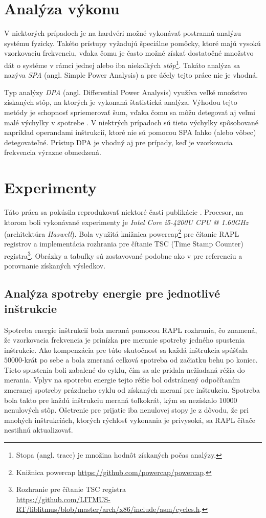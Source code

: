\section{Analýza výkonu}
V niektorých prípadoch je na hardvéri možné vykonávať postrannú analýzu systému fyzicky. Takéto prístupy vyžadujú špeciálne pomôcky,
ktoré majú vysokú vzorkovaciu frekvenciu, vďaka čomu je často možné získať dostatočné množstvo dát o systéme v rámci jednej alebo
iba niekoľkých \emph{stôp}\footnote{Stopa (angl. trace) je množina hodnôt získaných počas analýzy.}.
Takáto analýza sa nazýva \emph{SPA} (angl. Simple Power Analysis) a pre účely tejto práce nie je vhodná.

Typ analýzy \emph{DPA} (angl. Differential Power Analysis) využíva veľké množstvo získaných stôp, na ktorých je vykonaná štatistická analýza.
Výhodou tejto metódy je schopnosť spriemerovať šum, vďaka čomu sa môžu detegovať aj veľmi malé výchylky v spotrebe \cite{Platypus}. V niektrých prípadoch sú tieto
výchylky spôsobované napríklad operandami inštrukcií, ktoré nie sú pomocou SPA ľahko (alebo vôbec) detegovateľné. Prístup DPA je vhodný aj pre
prípady, keď je vzorkovacia frekvencia výrazne obmedzená.

\section{Experimenty}
Táto práca sa pokúsila reprodukovať niektoré časti publikácie \cite{Platypus}.
Procesor, na ktorom boli vykonávané experimenty je \emph{Intel Core i5-4200U CPU @ 1.60GHz} (architektúra \emph{Haswell}). Bola využitá knižnica
powercap\footnote{Knižnica powercap \href{https://github.com/powercap/powercap}{https://github.com/powercap/powercap}.} pre čítanie RAPL registrov
a implementácia rozhrania pre čítanie TSC (Time Stamp Counter) registra\footnote{Rozhranie pre čítanie TSC registra\\\href{https://github.com/LITMUS-RT/liblitmus/blob/master/arch/x86/include/asm/cycles.h}{https://github.com/LITMUS-RT/liblitmus/blob/master/arch/x86/include/asm/cycles.h}.}.
Obrázky a tabuľky sú zostavované podobne ako v \cite{Platypus} pre referenciu a porovnanie získaných výsledkov.

\subsection{Analýza spotreby energie pre jednotlivé inštrukcie}
Spotreba energie inštrukcií bola meraná pomocou RAPL rozhrania, čo znamená, že vzorkovacia frekvencia je prinízka pre meranie spotreby jedného spustenia inštrukcie.
Ako kompenzácia pre túto skutočnosť sa každá inštrukcia spúšťala $50000$-krát po sebe a bola zmeraná celková spotreba od začiatku behu po koniec. Tieto spustenia
boli zabalené do cyklu, čím sa ale pridala nežiadaná réžia do merania. Vplyv na spotrebu energie tejto réžie bol odstránený odpočítaním zmeranej spotreby
prázdneho cyklu od získaných meraní pre inštrukciu. Spotreba bola takto pre každú inštrukciu meraná toľkokrát, kým sa nezískalo $10000$ nenulových stôp.
Ošetrenie pre prijatie iba nenulovej stopy je z dôvodu, že pri mnohých inštrukciách, ktorých rýchlosť vykonania je privysoká, sa RAPL čítače nestihnú aktualizovať.

